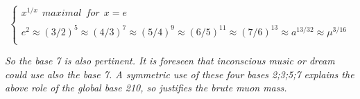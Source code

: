 \documentclass[a4paper,9pt]{article}
\begin{document}
\begin{equation}
 \left\{
    \begin{array}{ll}
       x^{1/x} ~~maximal~~ for~~ x = e\\
       \\
        e^2\approx (3/2)^5 \approx (4/3)^7\approx (5/4)^9\approx (6/5)^{11}\approx (7/6)^{13} \approx a^{13/32} \approx \mu^{3/16}\\

    \end{array}
\right.
\end{equation}


\textit{So the base 7 is also pertinent.  It is foreseen that inconscious music or dream could use also the base 7. A symmetric use of these four bases 2;3;5;7 explains the above role of the global base 210, so justifies the brute muon mass. }

 
\end{document}
